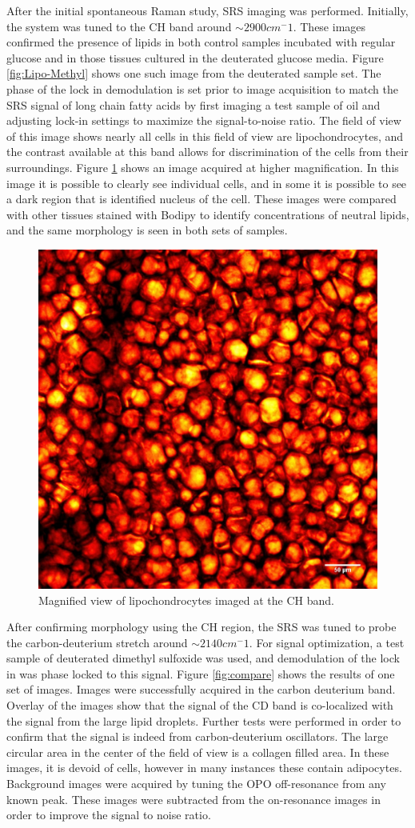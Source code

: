 After the initial spontaneous Raman study, SRS imaging was performed.  Initially, the system was tuned to the CH band around $\sim2900cm{^-1}$.  These images confirmed the presence of lipids in both control samples incubated with regular glucose and in those tissues cultured in the deuterated glucose media.  Figure \ref{fig:Lipo-Methyl} shows one such image from the deuterated sample set. The phase of the lock in demodulation is set prior to image acquisition to match the SRS signal of long chain fatty acids by first imaging a test sample of oil and adjusting lock-in settings to maximize the signal-to-noise ratio. The field of view of this image shows nearly all cells in this field of view are lipochondrocytes, and the contrast available at this band allows for discrimination of the cells from their surroundings. Figure \ref{fig:4chlipo} shows an image acquired at higher magnification. In this image it is possible to clearly see individual cells, and in some it is possible to see a dark region that is identified nucleus of the cell.  These images were compared with other tissues stained with Bodipy to identify concentrations of neutral lipids, and the same morphology is seen in both sets of samples.

\begin{figure}
    \centering
    \includegraphics[width=0.5\linewidth]{Figures/4-methyl.jpg}
    \caption{Magnified view of lipochondrocytes imaged at the CH band.}
    \label{fig:4chlipo}
\end{figure}

After confirming morphology using the CH region, the SRS was tuned to probe the carbon-deuterium stretch around $\sim2140cm{^-1}$.  For signal optimization, a test sample of deuterated dimethyl sulfoxide was used, and demodulation of the lock in was phase locked to this signal.  Figure \ref{fig:compare} shows the results of one set of images.  Images were successfully acquired in the carbon deuterium band.  Overlay of the images show that the signal of the CD band is co-localized with the signal from the large lipid droplets. Further tests were performed in order to confirm that the signal is indeed from carbon-deuterium oscillators.  The large circular area in the center of the field of view is a collagen filled area.  In these images, it is devoid of cells, however in many instances these contain adipocytes.  Background images were acquired by tuning the OPO off-resonance from any known peak. These images were subtracted from the on-resonance images in order to improve the signal to noise ratio.  

